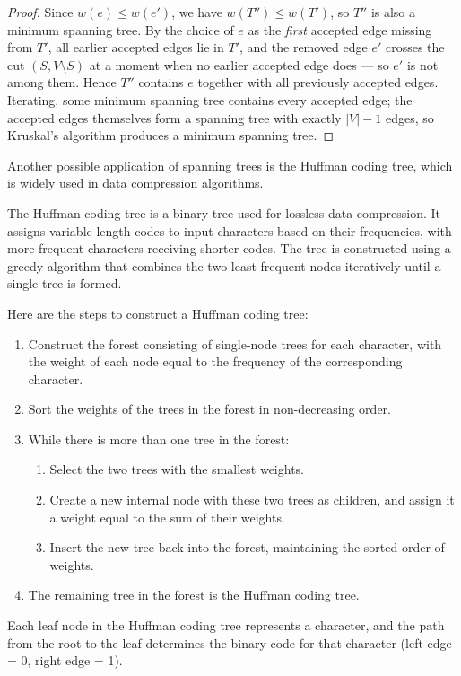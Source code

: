 \begin{proof}
Since $w(e) \leq w(e')$, we have $w(T'') \leq w(T')$, so $T''$ is also a minimum spanning tree. By the choice of $e$ as the \emph{first} accepted edge missing from $T'$, all earlier accepted edges lie in $T'$, and the removed edge $e'$ crosses the cut $(S, V \setminus S)$ at a moment when no earlier accepted edge does --- so $e'$ is not among them. Hence $T''$ contains $e$ together with all previously accepted edges. Iterating, some minimum spanning tree contains every accepted edge; the accepted edges themselves form a spanning tree with exactly $|V|-1$ edges, so Kruskal's algorithm produces a minimum spanning tree.

\end{proof}

Another possible application of spanning trees is the Huffman coding tree, which is widely used in data compression algorithms.

The Huffman coding tree is a binary tree used for lossless data compression. It assigns variable-length codes to input characters based on their frequencies, with more frequent characters receiving shorter codes. The tree is constructed using a greedy algorithm that combines the two least frequent nodes iteratively until a single tree is formed.

Here are the steps to construct a Huffman coding tree:
\begin{enumerate}
    \item Construct the forest consisting of single-node trees for each character, with the weight of each node equal to the frequency of the corresponding character.
    \item Sort the weights of the trees in the forest in non-decreasing order.
    \item While there is more than one tree in the forest:
    \begin{enumerate}
        \item Select the two trees with the smallest weights.
        \item Create a new internal node with these two trees as children, and assign it a weight equal to the sum of their weights.
        \item Insert the new tree back into the forest, maintaining the sorted order of weights.
    \end{enumerate}
    \item The remaining tree in the forest is the Huffman coding tree.
\end{enumerate}

Each leaf node in the Huffman coding tree represents a character, and the path from the root to the leaf determines the binary code for that character (left edge = 0, right edge = 1).

